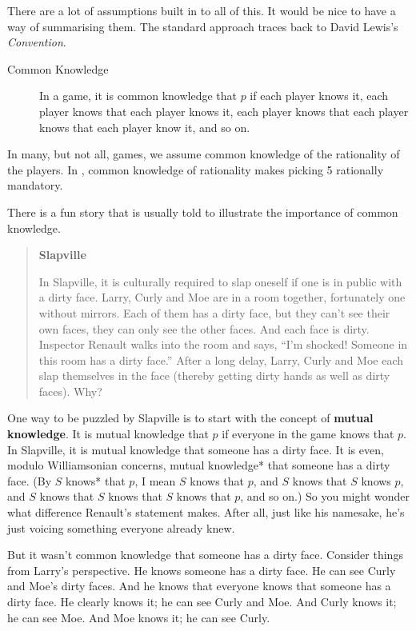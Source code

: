 \noindent There are a lot of assumptions built in to all of this. It would be nice to have a way of summarising them. The standard approach traces back to David Lewis's \textit{Convention}.

\begin{description}
\item[Common Knowledge] In a game, it is common knowledge that $p$ if each player knows it, each player knows that each player knows it, each player knows that each player knows that each player know it, and so on.
\end{description}

\noindent In many, but not all, games, we assume common knowledge of the rationality of the players. In , common knowledge of rationality makes picking 5 rationally mandatory.

There is a fun story that is usually told to illustrate the importance of common knowledge.

\begin{quote}
\textbf{Slapville}

In Slapville, it is culturally required to slap oneself if one is in public with a dirty face. Larry, Curly and Moe are in a room together, fortunately one without mirrors. Each of them has a dirty face, but they can't see their own faces, they can only see the other faces. And each face is dirty. Inspector Renault  walks into the room and says, ``I'm shocked! Someone in this room has a dirty face.'' After a long delay, Larry, Curly and Moe each slap themselves in the face (thereby getting dirty hands as well as dirty faces). Why?
\end{quote}

\noindent One way to be puzzled by Slapville is to start with the concept of \textbf{mutual knowledge}. It is mutual knowledge that $p$ if everyone in the game knows that $p$. In Slapville, it is mutual knowledge that someone has a dirty face. It is even, modulo Williamsonian concerns, mutual knowledge* that someone has a dirty face. (By $S$ knows* that $p$, I mean $S$ knows that $p$, and $S$ knows that $S$ knows $p$, and $S$ knows that $S$ knows that $S$ knows that $p$, and so on.) So you might wonder what difference Renault's statement makes. After all, just like his namesake, he's just voicing something everyone already knew.

But it wasn't common knowledge that someone has a dirty face. Consider things from Larry's perspective. He knows someone has a dirty face. He can see Curly and Moe's dirty faces. And he knows that everyone knows that someone has a dirty face. He clearly knows it; he can see Curly and Moe. And Curly knows it; he can see Moe. And Moe knows it; he can see Curly. 


